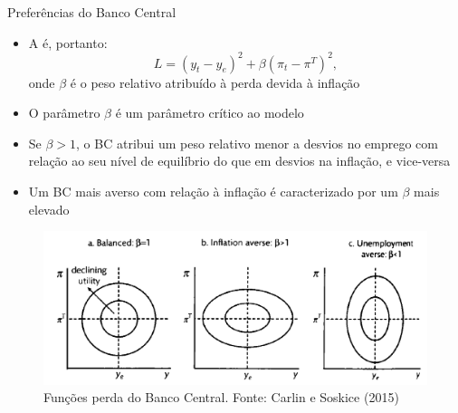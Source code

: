 \documentclass[10pt]{beamer}
\begin{document}
\begin{frame}
    {Preferências do Banco Central}
    \begin{itemize}
        \item A  é, portanto:
        \begin{equation*}
            L = \left(y_t - y_e\right)^2 + \beta \left(\pi_t - \pi^T\right)^2,
        \end{equation*}
        onde $\beta$ é o peso relativo atribuído à perda devida à inflação\bigskip
        \item O parâmetro $\beta$ é um parâmetro crítico ao modelo\bigskip
        \item Se $\beta > 1$, o BC atribui um peso relativo menor a desvios no emprego com relação ao seu nível de equilíbrio do que em desvios na inflação, e vice-versa\bigskip
        \item Um BC mais averso com relação à inflação é caracterizado por um $\beta$ mais elevado\bigskip
    \end{itemize}
\end{frame}

\begin{frame}
    \begin{figure}
        \includegraphics[width=\textwidth]{./figures/aula16_fig4.PNG}
        \caption{Funções perda do Banco Central. Fonte: Carlin e Soskice (2015)}
    \end{figure}
\end{frame}
\end{document}
